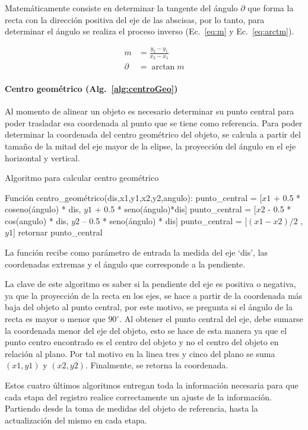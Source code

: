 Matemáticamente consiste en determinar la tangente del ángulo
$\partial$ que forma la recta con la dirección positiva del eje de las
abscisas, por lo tanto, para determinar el ángulo se realiza el
proceso inverso (Ec.~\ref{eq:m} y Ec.~\ref{eq:arctm}).

\begin{align}
  m & = \frac{y_2 - y_1}{x_2 - x_1} \label{eq:m}\\
  \partial & = \arctan{m} \label{eq:arctm}
\end{align}

\paragraph{Centro geométrico (Alg.~\ref{alg:centroGeo})}

Al momento de alinear un objeto es necesario determinar su punto
central para poder trasladar esa coordenada al punto que se tiene como
referencia. Para poder determinar la coordenada del centro geométrico
del objeto, se calcula a partir del tamaño de la mitad del eje mayor
de la elipse, la proyección del ángulo en el eje horizontal y vertical.

\begin{algorithm}
\caption{Algoritmo para calcular centro geométrico}
\label{alg:centroGeo}
\begin{algorithmic}[1]
\STATE Función centro\_geométrico(dis,x1,y1,x2,y2,angulo):
\STATE punto\_central = [$x1$ + 0.5 * coseno(ángulo) * dis, $y1$ + 0.5 * seno(ángulo)*dis]
\ENDIF
{}
\STATE punto\_central = [$x2$ - 0.5 * cos(angulo) * dis, $y2$ – 0.5 * seno(ángulo) * dis]
\ENDIF
{}
\STATE punto\_central = [$(x1-x2)/2$ , $y1$]
\ENDIF
\STATE retornar punto\_central
\end{algorithmic}
\end{algorithm}

La función recibe como parámetro de entrada la medida del eje ‘dis’,
las coordenadas extremas y el ángulo que corresponde a la pendiente.

La clave de este algoritmo es saber si la pendiente del eje es
positiva o negativa, ya que la proyección de la recta en los ejes, se
hace a partir de la coordenada más baja del objeto al punto central,
por este motivo, se pregunta si el ángulo de la recta es mayor o menor
que $90^\circ$. Al obtener el punto central del eje, debe sumarse la
coordenada menor del eje del objeto, esto se hace de esta manera ya
que el punto centro encontrado es el centro del objeto y no el centro
del objeto en relación al plano. Por tal motivo en la linea tres y
cinco del plano se suma $(x1,y1)$ y $(x2,y2)$. Finalmente, se retorna la
coordenada. 

Estos cuatro últimos algoritmos entregan toda la información necesaria
para que cada etapa del registro realice correctamente un ajuste de la
información. Partiendo desde la toma de medidas del objeto de
referencia, hasta la actualización del mismo en cada etapa.


